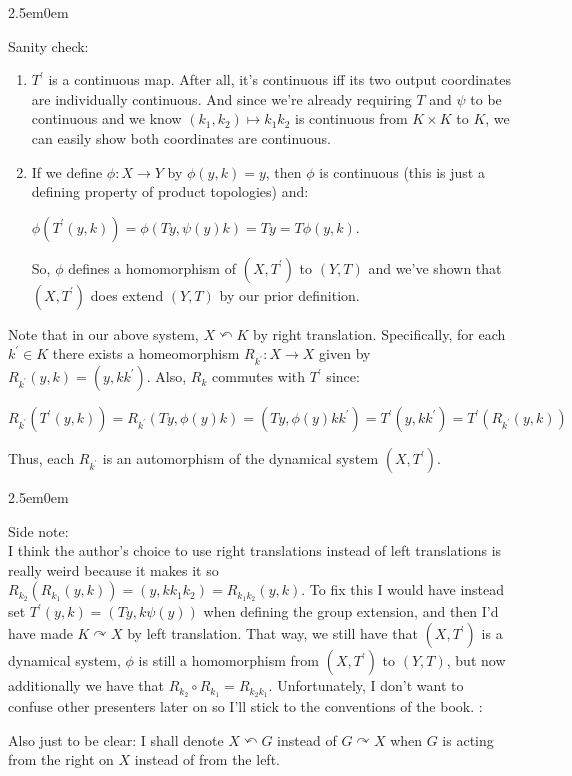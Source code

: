 \documentclass{book}
\newcommand{\hTwo}{%
\color{Black}%
   \fontsize{13}{15}\selectfont%
}
\newcommand{\myComment}{%
   \color{RawerSienna}%
   \fontsize{12}{14}\selectfont%
}
\newcommand{\pracTwo}{
   \color{Orange}%
   \fontsize{12}{14}\selectfont%
}
\newenvironment{myIndent}{%
   \begin{adjustwidth}{2.5em}{0em}%
}{%
   \end{adjustwidth}%
}
\newcommand{\retTwo}{\hfill\bigbreak}
\begin{document}
\begin{myIndent}\pracTwo
	Sanity check:
	\begin{enumerate}
		\item $T^\prime$ is a continuous map. After all, it's continuous iff its two output coordinates are individually continuous. And since we're already requiring $T$ and $\psi$ to be continuous and we know $(k_1, k_2) \mapsto k_1k_2$ is continuous from $K \times K$ to $K$, we can easily show both coordinates are continuous.\retTwo 
		
		\item If we define $\phi: X \to Y$ by $\phi(y, k) = y$, then $\phi$ is continuous (this is just a defining property of product topologies) and:
		
		{\centering$\phi(T^\prime(y, k)) = \phi(Ty, \psi(y)k) = Ty = T\phi(y, k)$.\retTwo\par}

		So, $\phi$ defines a homomorphism of $(X, T^\prime)$ to $(Y, T)$ and we've shown that $(X, T^\prime)$ does extend $(Y, T)$ by our prior definition.\retTwo
	\end{enumerate}
\end{myIndent}

\hTwo Note that in our above system, $X \curvearrowleft K$ by right translation. Specifically, for each $k^\prime \in K$ there exists a homeomorphism $R_{k^\prime} : X \to X$ given by $R_{k^\prime}(y, k) = (y, kk^\prime)$. Also, $R_k$ commutes with $T^\prime$ since:

{\centering $R_{k^\prime}(T^\prime(y, k)) = R_{k^\prime}(Ty, \phi(y)k) = (Ty, \phi(y)kk^\prime) = T^\prime(y, kk^\prime) = T^\prime(R_{k^\prime}(y, k))$ \retTwo\par}

Thus, each $R_{k^\prime}$ is an automorphism of the dynamical system $(X, T^\prime)$.


\begin{myIndent}\myComment 
	Side note:\\
	I think the author's choice to use right translations instead of left translations is really weird because it makes it so $R_{k_2}(R_{k_1}(y, k)) = (y, kk_1k_2) = R_{k_1k_2}(y, k)$. To fix this I would have instead set $T^\prime(y, k) = (Ty, k\psi(y))$ when defining the group extension, and then I'd have made $K \curvearrowright X$ by left translation. That way, we still have that $(X, T^\prime)$ is a dynamical system, $\phi$ is still a homomorphism from $(X, T^\prime)$ to $(Y, T)$, but now additionally we have that $R_{k_2} \circ R_{k_1} = R_{k_2k_1}$. Unfortunately, I don't want to confuse other presenters later on so I'll stick to the conventions of the book. :\lparen\newpage

	Also just to be clear: I shall denote $X \curvearrowleft G$ instead of $G \curvearrowright X$ when $G$ is acting from the right on $X$ instead of from the left.\retTwo
\end{myIndent}
\end{document}
